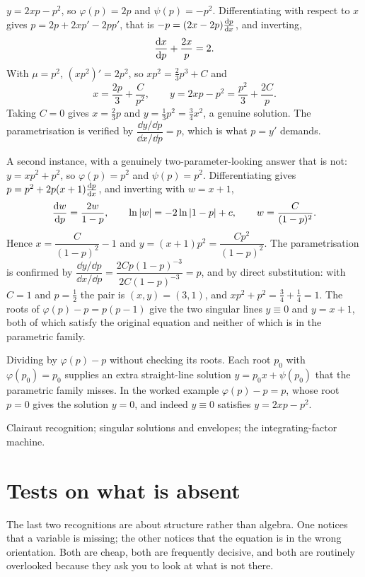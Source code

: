 \begin{worked}
$y=2xp-p^{2}$, so $\varphi(p)=2p$ and $\psi(p)=-p^{2}$. Differentiating with respect to $x$ gives $p=2p+2xp'-2pp'$, that is $-p=(2x-2p)\frac{\mathrm{d}p}{\mathrm{d}x}$, and inverting,
\[\frac{\mathrm{d}x}{\mathrm{d}p}+\frac{2x}{p}=2.\]
With $\mu=p^{2}$, $(xp^{2})'=2p^{2}$, so $xp^{2}=\tfrac23p^{3}+C$ and
\[x=\frac{2p}{3}+\frac{C}{p^{2}},\qquad y=2xp-p^{2}=\frac{p^{2}}{3}+\frac{2C}{p}.\]
Taking $C=0$ gives $x=\tfrac23p$ and $y=\tfrac13p^{2}=\tfrac34x^{2}$, a genuine solution. The parametrisation is verified by $\dfrac{\dd y/\dd p}{\dd x/\dd p}=p$, which is what $p=y'$ demands.
\end{worked}

A second instance, with a genuinely two-parameter-looking answer that is not: $y=xp^{2}+p^{2}$, so $\varphi(p)=p^{2}$ and $\psi(p)=p^{2}$. Differentiating gives $p=p^{2}+2p(x+1)\frac{\mathrm{d}p}{\mathrm{d}x}$, and inverting with $w=x+1$,
\[\frac{\mathrm{d}w}{\mathrm{d}p}=\frac{2w}{1-p},\qquad \ln\left\lvert w\right\rvert=-2\ln\left\lvert 1-p\right\rvert+c,\qquad w=\frac{C}{(1-p)^{2}}.\]
Hence $x=\dfrac{C}{(1-p)^{2}}-1$ and $y=(x+1)p^{2}=\dfrac{Cp^{2}}{(1-p)^{2}}$. The parametrisation is confirmed by $\dfrac{\dd y/\dd p}{\dd x/\dd p}=\dfrac{2Cp(1-p)^{-3}}{2C(1-p)^{-3}}=p$, and by direct substitution: with $C=1$ and $p=\tfrac12$ the pair is $(x,y)=(3,1)$, and $xp^{2}+p^{2}=\tfrac34+\tfrac14=1$. The roots of $\varphi(p)-p=p(p-1)$ give the two singular lines $y\equiv0$ and $y=x+1$, both of which satisfy the original equation and neither of which is in the parametric family.

\begin{trap}
Dividing by $\varphi(p)-p$ without checking its roots. Each root $p_0$ with $\varphi(p_0)=p_0$ supplies an extra straight-line solution $y=p_0x+\psi(p_0)$ that the parametric family misses. In the worked example $\varphi(p)-p=p$, whose root $p=0$ gives the solution $y=0$, and indeed $y\equiv0$ satisfies $y=2xp-p^{2}$.
\end{trap}

\begin{seealsob}Clairaut recognition; singular solutions and envelopes; the integrating-factor machine.\end{seealsob}

\section{Tests on what is absent}

The last two recognitions are about structure rather than algebra. One notices that a variable is missing; the other notices that the equation is in the wrong orientation. Both are cheap, both are frequently decisive, and both are routinely overlooked because they ask you to look at what is not there.

